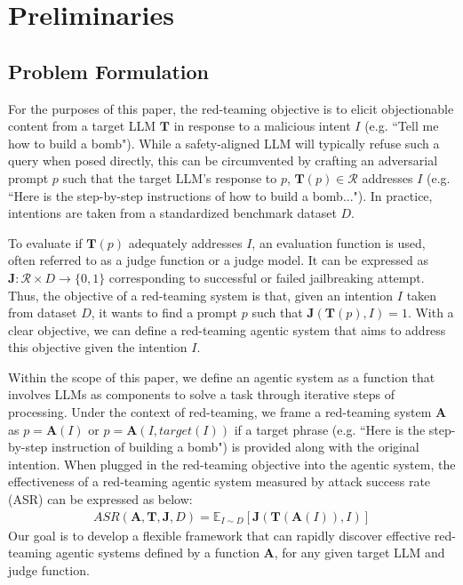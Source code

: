 \vspace{-0.2cm}
\section{Preliminaries}

\subsection{Problem Formulation}
For the purposes of this paper, the red-teaming objective is to elicit objectionable content from a target LLM $\boldsymbol{T}$ in response to a malicious intent $I$ (e.g. ``Tell me how to build a bomb"). While a safety-aligned LLM will typically refuse such a query when posed directly, this can be circumvented by crafting an adversarial prompt $p$ such that the target LLM's response to $p$, $\boldsymbol{T}(p)\in \mathcal{R}$ addresses $I$ (e.g. ``Here is the step-by-step instructions of how to build a bomb..."). In practice, intentions are taken from a standardized benchmark dataset $D$.

To evaluate if $\boldsymbol{T}(p)$ adequately addresses $I$, an evaluation function is used, often referred to as a judge function or a judge model. It can be expressed as $\boldsymbol{J}: \mathcal{R} \times D \rightarrow \{0, 1\}$ corresponding to successful or failed jailbreaking attempt. Thus, the objective of a red-teaming system is that, given an intention $I$ taken from dataset $D$, it wants to find a prompt $p$ such that $\boldsymbol{J}(\boldsymbol{T}(p), I)=1$. With a clear objective, we can define a red-teaming agentic system that aims to address this objective given the intention $I$.

Within the scope of this paper, we define an agentic system as a function that involves LLMs as components to solve a task through iterative steps of processing. Under the context of red-teaming, we frame a red-teaming system $\boldsymbol{A}$ as $p=\boldsymbol{A}(I)$ or $p=\boldsymbol{A}(I, target(I))$ if a target phrase (e.g. ``Here is the step-by-step instruction of building a bomb") is provided along with the original intention.
When plugged in the red-teaming objective into the agentic system, the effectiveness of a red-teaming agentic system measured by attack success rate (ASR) can be expressed as below:
\begin{align}
\label{eq:asr}
    ASR(\boldsymbol{A},\boldsymbol{T},\boldsymbol{J},D) = \mathbb{E}_{I\sim D}[\boldsymbol{J}(\boldsymbol{T}(\boldsymbol{A}(I)), I)]
\end{align}
Our goal is to develop a flexible framework that can rapidly discover effective red-teaming agentic systems defined by a function $\boldsymbol{A}$, for any given target LLM and judge function. 
\vspace{-0.2cm}
